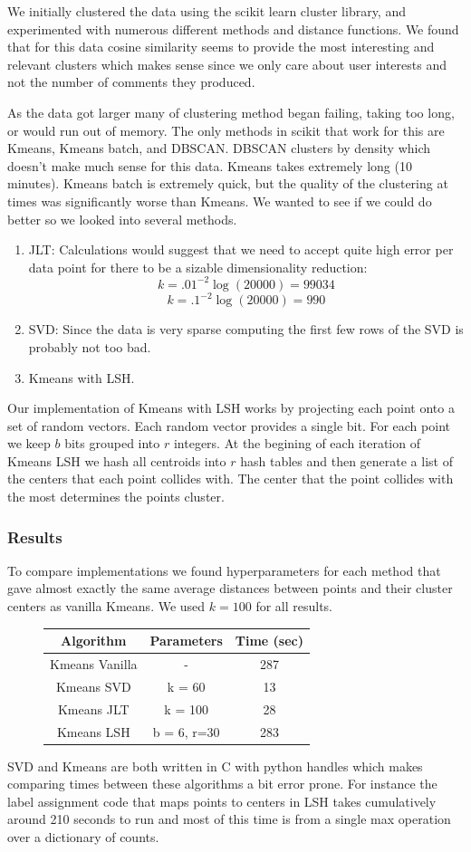 \documentclass[12pt]{article}
\numberwithin{equation}{section}
\begin{document}
We initially clustered the data using the scikit learn cluster library, and experimented with numerous different 
methods and distance functions. We found that for this data cosine similarity seems to provide the most interesting 
and relevant clusters which makes sense since we only care about user interests and not the number of comments 
they produced.

As the data got larger many of clustering method began failing, taking too long, or 
would run out of memory. The only methods in scikit that work for this are Kmeans, Kmeans batch, and DBSCAN. 
DBSCAN clusters by density which doesn't make much sense for this data. Kmeans takes extremely long (10 minutes). 
Kmeans batch is extremely quick, but the quality of the clustering at times was significantly worse than Kmeans. 
We wanted to see if we could do better so we looked into several methods.
\begin{enumerate}
\item JLT: Calculations would suggest that we need to accept quite high error per data point for there to be a sizable dimensionality reduction:
 $$k = .01^{-2} \log(20000) = 99034$$
 $$k = .1^{-2} \log(20000) = 990$$
\item SVD: Since the data is very sparse computing the first few rows of the SVD is probably not too bad. 
\item Kmeans with LSH. 
\end{enumerate} 
Our implementation of Kmeans with LSH works by projecting each point onto a set of random vectors. Each random 
vector provides a single bit. For each point we keep $b$ bits grouped into $r$ integers. 
At the begining of each iteration of Kmeans LSH we hash all centroids into $r$ hash tables and then 
generate a list of the centers that each point collides with. The center that the point collides
with the most determines the points cluster. 

\subsubsection*{Results}
To compare implementations we found hyperparameters for each method that gave almost exactly the same 
 average distances between points and their cluster centers as vanilla Kmeans. We used $k = 100$ for all results. 
\begin{figure}[h!]
	\centering
	\begin{tabular}{|c|c|c|}
		\hline Algorithm & Parameters & Time (sec)\\ 
		\hline Kmeans Vanilla & - & 287 \\ 
		\hline Kmeans SVD & k = 60 & 13 \\ 
		\hline Kmeans JLT & k = 100 & 28 \\ 
		\hline Kmeans LSH & b = 6, r=30 & 283\\ 
		\hline 
	\end{tabular} 
\end{figure}
SVD and Kmeans are both written in C with python handles which makes comparing times between these algorithms a bit 
error prone. For instance the label assignment code that maps 
points to centers in LSH takes cumulatively around 210 seconds to run and most of this time is from a single max 
operation over a dictionary of counts. 
\end{document}
